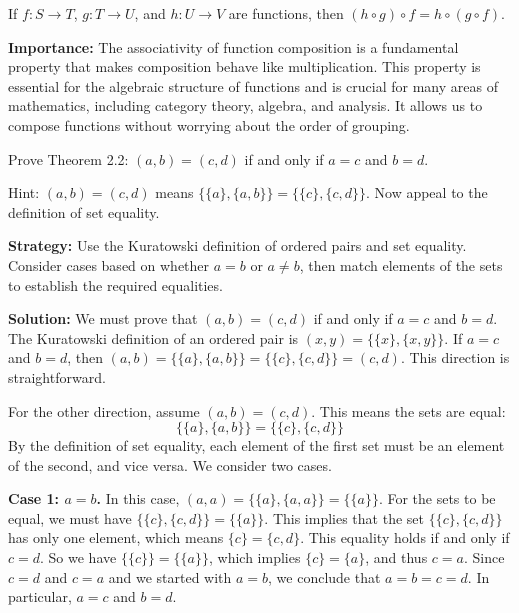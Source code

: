 \begin{theorem}
If $f: S \to T$, $g: T \to U$, and $h: U \to V$ are functions, then $(h \circ g) \circ f = h \circ (g \circ f)$.
\end{theorem}

\noindent\textbf{Importance:} The associativity of function composition is a fundamental property that makes composition behave like multiplication. This property is essential for the algebraic structure of functions and is crucial for many areas of mathematics, including category theory, algebra, and analysis. It allows us to compose functions without worrying about the order of grouping.





\begin{problembox}
\begin{problemstatement}
Prove Theorem 2.2: $(a, b) = (c, d)$ if and only if $a=c$ and $b=d$.

Hint: $(a, b) = (c, d)$ means $\{\{a\}, \{a, b\}\} = \{\{c\}, \{c, d\}\}$. Now appeal to the definition of set equality.
\end{problemstatement}
\end{problembox}

\noindent\textbf{Strategy:} Use the Kuratowski definition of ordered pairs and set equality. Consider cases based on whether $a=b$ or $a\neq b$, then match elements of the sets to establish the required equalities.

\bigskip\noindent\textbf{Solution:}  
We must prove that $(a, b) = (c, d)$ if and only if $a=c$ and $b=d$.
The Kuratowski definition of an ordered pair is $(x, y) = \{\{x\}, \{x, y\}\}$.
If $a=c$ and $b=d$, then $(a,b) = \{\{a\}, \{a,b\}\} = \{\{c\}, \{c,d\}\} = (c,d)$. This direction is straightforward.

For the other direction, assume $(a, b) = (c, d)$. This means the sets are equal:
\[ \{\{a\}, \{a, b\}\} = \{\{c\}, \{c, d\}\} \]
By the definition of set equality, each element of the first set must be an element of the second, and vice versa. We consider two cases.

\textbf{Case 1: $a=b$.}
In this case, $(a, a) = \{\{a\}, \{a, a\}\} = \{\{a\}\}$.
For the sets to be equal, we must have $\{\{c\}, \{c, d\}\} = \{\{a\}\}$. This implies that the set $\{\{c\}, \{c, d\}\}$ has only one element, which means $\{c\} = \{c, d\}$. This equality holds if and only if $c=d$.
So we have $\{\{c\}\} = \{\{a\}\}$, which implies $\{c\} = \{a\}$, and thus $c=a$.
Since $c=d$ and $c=a$ and we started with $a=b$, we conclude that $a = b = c = d$. In particular, $a=c$ and $b=d$.


